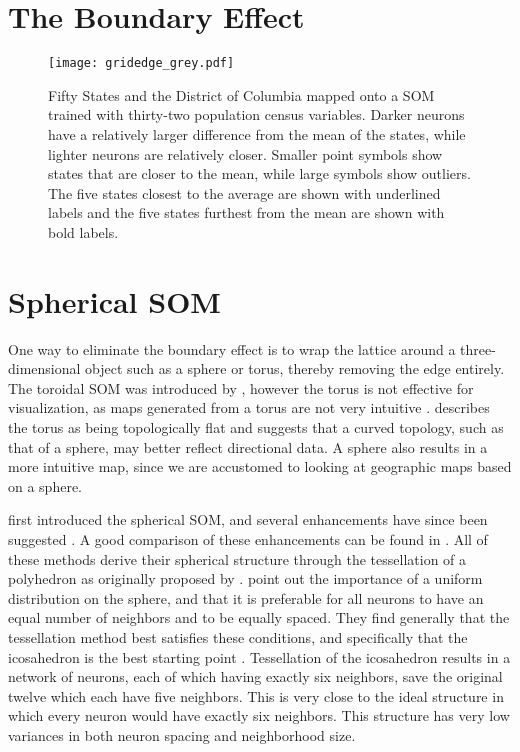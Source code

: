 \section{The Boundary Effect}


\begin{figure}
\centering
\texttt{[image: gridedge\_grey.pdf]}
\caption{Fifty States and the District of Columbia mapped onto a
SOM trained with thirty-two population census variables.  Darker neurons have a
relatively larger difference from the mean of the states, while lighter
neurons are relatively closer.  Smaller point symbols show states that are closer to the
mean, while large symbols show outliers. The five states closest to the average are shown
with underlined labels and the five states furthest from the mean are shown with
bold labels.}
\label{figure1}
\end{figure}

\section{Spherical SOM}
One way to eliminate the boundary effect is to wrap the lattice around a
three-dimensional object such as a sphere or torus, thereby removing the edge
entirely. The toroidal SOM was introduced by \cite{li1993}, however the torus is
not effective for visualization, as maps generated from a torus are not
very intuitive \citep{ito2000,wu2006}.  \cite{ritter99} describes the torus as
being topologically flat and suggests that a curved topology, such as that of a
sphere, may better reflect directional data.  A sphere also results in a more
intuitive map, since we are accustomed to looking at geographic maps based on a sphere.

\cite{ritter99} first introduced the spherical SOM, and several enhancements have
since been suggested \citep{boudjemai2003,sangole03,Nishio:2006fk,wu2006}.  A
good comparison of these enhancements can be found in \cite{wu2006}.  All of
these methods derive their spherical structure through the tessellation of a
polyhedron as originally proposed by \cite{ritter99}.  \cite{wu2006} point
out the importance of a uniform distribution on the sphere, and that it is
preferable for all neurons to have an equal number of neighbors and to be
equally spaced.  They find generally that the tessellation method best satisfies
these conditions, and specifically that the icosahedron is the best starting
point \citep{wu2005}. Tessellation of the icosahedron results in a network of
neurons, each of which having exactly six neighbors, save the original twelve
which each have five neighbors.  This is very close to the ideal structure in which every
neuron would have exactly six neighbors.  This structure has very low variances
in both neuron spacing and neighborhood size.

